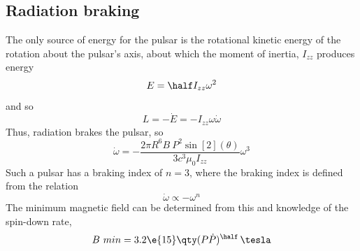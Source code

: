 \subsection{Radiation braking}
\label{sec:radiation-braking}

The only source of energy for the pulsar is the rotational kinetic
energy of the rotation about the pulsar's axis, about which the moment
of inertia, $I_{zz}$ produces energy
\begin{equation}
  \label{eq:91}
  E = \half I_{zz} \omega^2
\end{equation}
and so
\begin{equation}
  \label{eq:92}
  L = - \dot{E} = - I_{zz} \omega \dot{\omega}
\end{equation}
Thus, radiation brakes the pulsar, so
\begin{equation}
  \label{eq:93}
  \dot{\omega} = - \frac{2 \pi R^6 B~P^2 \sin[2](\theta)}{3 c^3 \mu_0 I_{zz}} \omega^3
\end{equation}
Such a pulsar has a braking index of $n=3$, where the braking index is
defined from the relation
\begin{equation}
  \label{eq:94}
  \dot{\omega} \propto -\omega^n
\end{equation}
The minimum magnetic field can be determined from this and knowledge
of the spin-down rate, 
\[ B~{min} = 3.2\e{15} \qty( P \dot{P} )^{\half}\,\tesla \]

